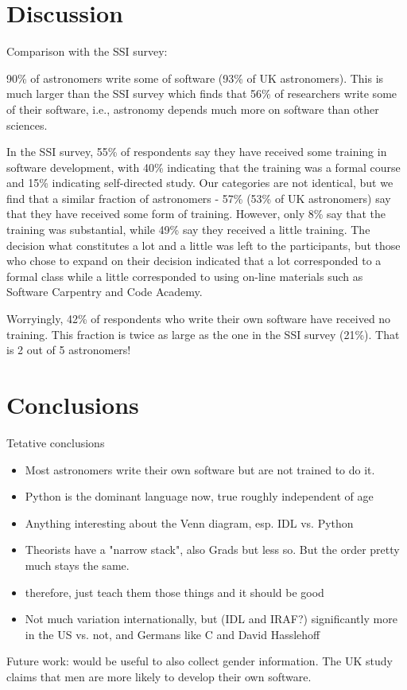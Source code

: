 \section{Discussion}

Comparison with the SSI survey:

90\% of astronomers write some of software (93\% of UK astronomers). This is much larger than the SSI survey which finds that 56\% of researchers write some of their software, i.e., astronomy depends much more on software than other sciences.

In the SSI survey, 55\% of respondents say they have received some training in software development, with 40\% indicating that the training was a formal course and 15\% indicating self-directed study. Our categories are not identical, but we find that a similar fraction of astronomers - 57\% (53\% of UK astronomers) say that they have received some form of training. However, only 8\% say that the training was substantial, while 49\% say they received a little training. The decision what constitutes a lot and a little was left to the participants, but those who chose to expand on their decision indicated that a lot corresponded to a formal class while a little corresponded to using on-line materials such as Software Carpentry and Code Academy.

Worryingly, 42\% of respondents who write their own software have received no training. This fraction is twice as large as the one in the SSI survey (21\%). That is 2 out of 5 astronomers! 


\section{Conclusions}

Tetative conclusions
\begin{itemize}
\item Most astronomers write their own software but are not trained to do it.
\item Python is the dominant language now, true roughly independent of age
\item Anything interesting about the Venn diagram, esp. IDL vs. Python
\item Theorists have a "narrow stack", also Grads but less so.  But the order pretty much stays the same.
\item therefore, just teach them those things and it should be good
\item Not much variation internationally, but (IDL and IRAF?) significantly more in the US vs. not, and Germans like C and David Hasslehoff
\end{itemize}

Future work: would be useful to also collect gender information. The UK study claims that men are more likely to develop their own software. 